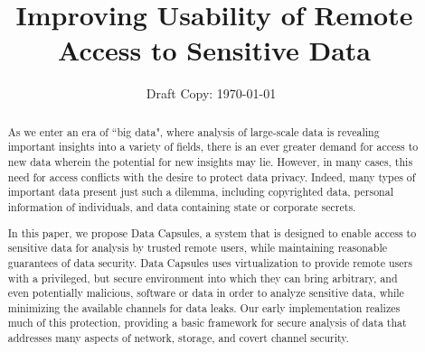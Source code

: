 \documentclass{acm_proc_article-sp}
\begin{document}
\title{Improving Usability of Remote Access to Sensitive Data}

\author{
Draft Copy: \today\ \currenttime
}

%

\maketitle
\begin{abstract}

As we enter an era of ``big data", where analysis of large-scale data is
revealing important insights into a variety of fields, there is an ever greater
demand for access to new data wherein the potential for new insights may lie.
However, in many cases, this need for access conflicts with the desire to
protect data privacy.  Indeed, many types of important data present just such a
dilemma, including copyrighted data, personal information of individuals, and
data containing state or corporate secrets.

In this paper, we propose Data Capsules, a system that is designed to enable
access to sensitive data for analysis by trusted remote users, while
maintaining reasonable guarantees of data security.  Data Capsules uses
virtualization to provide remote users with a privileged, but secure
environment into which they can bring arbitrary, and even potentially
malicious, software or data in order to analyze sensitive data, while
minimizing the available channels for data leaks.  Our early implementation
realizes much of this protection, providing a basic framework for secure
analysis of data that addresses many aspects of network, storage, and covert
channel security.

\end{abstract}
\end{document}
